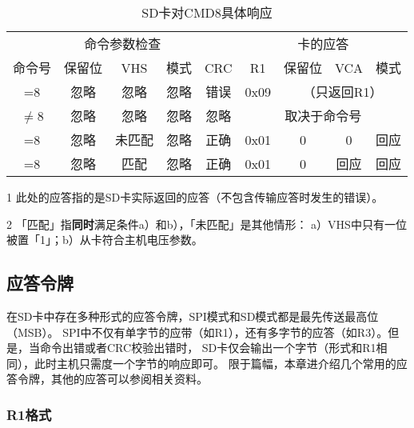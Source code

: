 \begin{table}[!htb]
    \centering
    \caption{SD卡对CMD8具体响应} \label{tab:cmd8}
    \begin{threeparttable}
    \begin{tabular}{*{9}{c}}
        \toprule
        \multicolumn{5}{c}{命令参数检查} & \multicolumn{4}{c}{卡的应答\tnote{1}}\\
        \cmidrule(r){1-5} \cmidrule(r){6-9}
        命令号 & 保留位 & VHS & 模式 & CRC & R1 & 保留位 & VCA & 模式 \\ \midrule
        =8 & 忽略 & 忽略 & 忽略 & 错误 & 0x09 & \multicolumn{3}{c}{（只返回R1）} \\ \midrule
        $\neq$8 & 忽略 & 忽略 & 忽略 & 忽略 & \multicolumn{4}{c}{取决于命令号}\\ \midrule
        =8 & 忽略 & 未匹配\tnote{2} & 忽略 & 正确 & 0x01 & 0 & 0 & 回应 \\ \midrule
        =8 & 忽略 & 匹配\tnote{2} & 忽略 & 正确 & 0x01 & 0 & 回应 & 回应 \\
        \bottomrule
    \end{tabular}
    \begin{tablenotes}
          \item [1] 此处的应答指的是SD卡实际返回的应答（不包含传输应答时发生的错误）。
          \item [2] 「匹配」指\textbf{同时}满足条件a）和b），「未匹配」是其他情形：
           a）VHS中只有一位被置「1」；b）从卡符合主机电压参数。
    \end{tablenotes}
    \end{threeparttable}
\end{table}


\subsection{应答令牌}
\label{sec:resp}

在SD卡中存在多种形式的应答令牌，SPI模式和SD模式都是最先传送最高位（MSB）。
SPI中不仅有单字节的应带（如R1），还有多字节的应答（如R3）。但是，当命令出错或者CRC校验出错时，
SD卡仅会输出一个字节（形式和R1相同），此时主机只需度一个字节的响应即可。
限于篇幅，本章进介绍几个常用的应答令牌，其他的应答可以参阅相关资料。

\subsubsection{R1格式}
\label{sec:r1}

